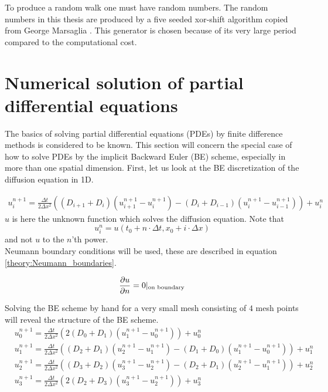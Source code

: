 To produce a random walk one must have random numbers. 
The random numbers in this thesis are produced by a five seeded xor-shift algorithm copied from George Marsaglia \cite{marsaglia2003xorshift}. 
This generator is chosen because of its very large period compared to the computational cost.

\section{Numerical solution of partial differential equations}

The basics of solving partial differential equations (PDEs) by finite difference methods is considered to be known. 
This section will concern the special case of how to solve PDEs by the implicit Backward Euler (BE) scheme, especially in more than one spatial dimension.
First, let us look at the BE discretization of the diffusion equation in 1D. 

\begin{align}\label{theory:BE_scheme_1D}
 u^{n+1}_i = \frac{\Delta t}{2\Delta x^2}\left((D_{i+1}+D_{i})(u^{n+1}_{i+1}-u^{n+1}_{i})-(D_{i}+D_{i-1})(u^{n+1}_{i}-u^{n+1}_{i-1})\right) + u^n_i
\end{align}
$u$ is here the unknown function which solves the diffusion equation. 
Note that 
$$u^n_i = u(t_0+n\cdot\Delta t,x_0+i\cdot\Delta x)$$
and not $u$ to the $n$'th power. \\
Neumann boundary conditions will be used, these are described in equation \eqref{theory:Neumann_boundaries}.

\begin{equation}\label{theory:Neumann_boundaries}
 \frac{\partial u}{\partial n} = 0|_{\text{on boundary}}
\end{equation}

Solving the BE scheme by hand for a very small mesh consisting of $4$ mesh points will reveal the structure of the BE scheme.
\begin{align*}
 &u^{n+1}_0 =  \frac{\Delta t}{2\Delta x^2}\left(2(D_{0}+D_{1})(u^{n+1}_{1}-u^{n+1}_{0})\right) + u^n_0\\
 &u^{n+1}_1 = \frac{\Delta t}{2\Delta x^2}\left((D_{2}+D_{1})(u^{n+1}_{2}-u^{n+1}_{1})-(D_{1}+D_{0})(u^{n+1}_{1}-u^{n+1}_{0})\right) + u^n_1\\
 &u^{n+1}_2 = \frac{\Delta t}{2\Delta x^2}\left((D_{3}+D_{2})(u^{n+1}_{3}-u^{n+1}_{2})-(D_{2}+D_{1})(u^{n+1}_{2}-u^{n+1}_{1})\right) + u^n_2 \\
 &u^{n+1}_3 =  \frac{\Delta t}{2\Delta x^2}\left(2(D_{2}+D_{3})(u^{n+1}_{3}-u^{n+1}_{2})\right) + u^n_3
\end{align*}

